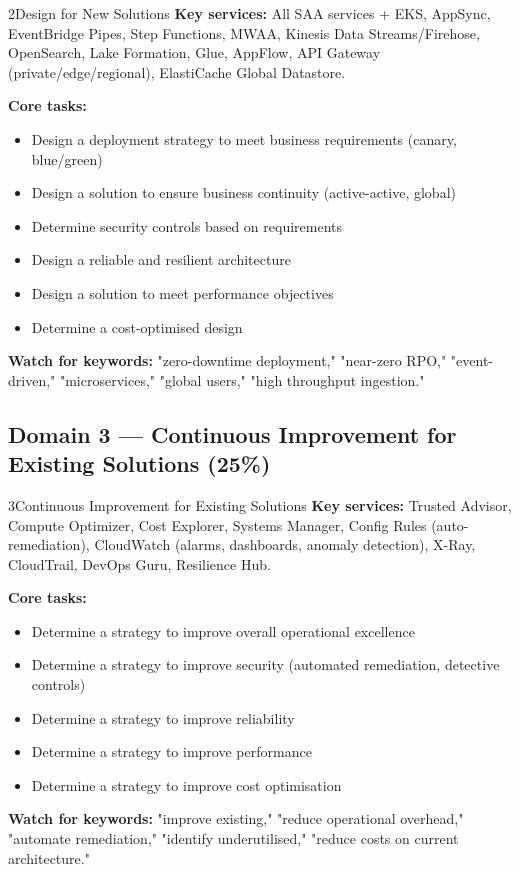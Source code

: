 \begin{domainsummary}{2}{Design for New Solutions}
\textbf{Key services:} All SAA services + EKS, AppSync, EventBridge Pipes,
Step Functions, MWAA, Kinesis Data Streams/Firehose, OpenSearch, Lake Formation,
Glue, AppFlow, API Gateway (private/edge/regional), ElastiCache Global Datastore.

\textbf{Core tasks:}
\begin{itemize}
  \item Design a deployment strategy to meet business requirements (canary, blue/green)
  \item Design a solution to ensure business continuity (active-active, global)
  \item Determine security controls based on requirements
  \item Design a reliable and resilient architecture
  \item Design a solution to meet performance objectives
  \item Determine a cost-optimised design
\end{itemize}

\textbf{Watch for keywords:} "zero-downtime deployment," "near-zero RPO,"
"event-driven," "microservices," "global users," "high throughput ingestion."
\end{domainsummary}

\subsection{Domain 3 — Continuous Improvement for Existing Solutions (25\%)}

\begin{domainsummary}{3}{Continuous Improvement for Existing Solutions}
\textbf{Key services:} Trusted Advisor, Compute Optimizer, Cost Explorer, Systems Manager,
Config Rules (auto-remediation), CloudWatch (alarms, dashboards, anomaly detection),
X-Ray, CloudTrail, DevOps Guru, Resilience Hub.

\textbf{Core tasks:}
\begin{itemize}
  \item Determine a strategy to improve overall operational excellence
  \item Determine a strategy to improve security (automated remediation, detective controls)
  \item Determine a strategy to improve reliability
  \item Determine a strategy to improve performance
  \item Determine a strategy to improve cost optimisation
\end{itemize}

\textbf{Watch for keywords:} "improve existing," "reduce operational overhead,"
"automate remediation," "identify underutilised," "reduce costs on current architecture."
\end{domainsummary}

